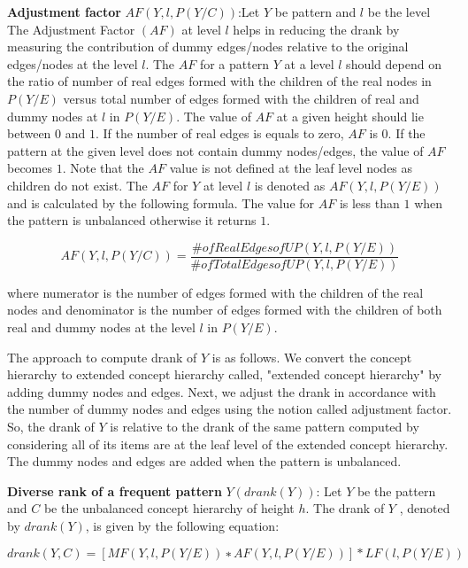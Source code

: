 \textbf{Adjustment factor} $AF (Y, l, P (Y /C))$:Let $Y$ be pattern and $l$ be the level
The Adjustment Factor $(AF)$ at level $l$ helps in reducing the drank by measuring the contribution of dummy edges/nodes relative to the original edges/nodes at the level $l$. 
The $AF$ for a pattern $Y$ at a level $l$ should depend on the ratio of number of real edges formed with the children of the 
real nodes in $P (Y /E)$ versus total number of edges formed with the children of real and dummy nodes at $l$ in $P (Y /E)$. 
The value of $AF$ at a given height should lie between $0$ and $1$. 
If the number of real edges is equals to zero, $AF$ is $0$.
If the pattern at the given level does not contain dummy nodes/edges, the value of $AF$ becomes $1$.
Note that the $AF$ value is not defined at the leaf level nodes as children do not exist. 
The $AF$ for $Y$ at level $l$ is denoted as $AF (Y, l, P (Y /E))$ and is calculated by the following formula.
The value for $AF$ is less than $1$ when the pattern is unbalanced otherwise it returns $1$.

\begin{equation}
    AF (Y, l, P (Y /C)) = \frac{\# of Real Edges of U P (Y, l, P (Y /E)) }{ \# of T otal Edges of U P (Y, l, P (Y /E))}
\end{equation}

where numerator is the number of edges formed with the children of the real nodes and denominator is the number of edges formed with the children of both real and dummy nodes at the level $l$ in $P (Y /E)$.

The approach to compute drank of $Y$ is as follows. 
We convert the concept hierarchy to extended concept hierarchy called, "extended concept hierarchy" by adding dummy nodes and edges. 
Next, we adjust the drank in accordance with the number of dummy nodes and edges using the notion called adjustment factor. 
So, the drank of $Y$ is relative to the drank of the same pattern computed by considering all of its items are at the leaf level of the extended concept hierarchy. 
The dummy nodes and edges are added when the pattern is unbalanced.

\textbf{Diverse rank of a frequent pattern} $Y (drank(Y))$: Let $Y$ be the pattern and $C$ be the unbalanced concept hierarchy
of height $h$. 
The drank of $Y$ , denoted by $drank(Y )$, is given by the following equation:

\begin{equation}
    drank(Y, C) = [M F (Y, l, P (Y /E)) ∗ AF (Y, l, P (Y /E))] * LF (l, P (Y /E))     
\end{equation}

